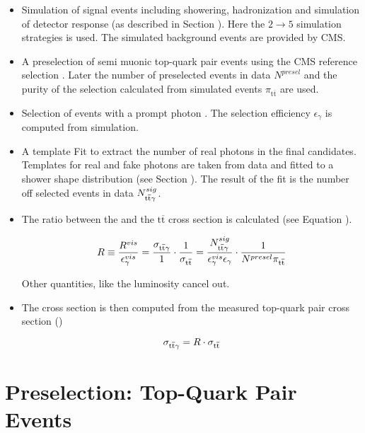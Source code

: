 \begin{itemize}
\item Simulation of \ttgamma signal events including showering, hadronization and simulation of detector response (as described in Section ). Here the $2 \to 5$ simulation strategies is used. The simulated background events are provided by CMS.
\item A preselection of semi muonic top-quark pair events using the CMS reference selection . Later the number of preselected events in data $N^{presel}$ and the purity of the selection calculated from simulated events $\pi_{\mathrm{t}\overline{\mathrm{t}}}$ are used.
\item Selection of events with a prompt photon . The selection efficiency $\epsilon_{\gamma}$ is computed from simulation.
\item A template Fit to extract the number of real photons in the final candidates. Templates for real and fake photons are taken from data and fitted to a shower shape distribution (see Section ). The result of the fit is the number off selected \ttgamma events in data $N^{sig}_{\mathrm{t}\overline{\mathrm{t}} \gamma}$.
\item The ratio between the \ttgamma and the $\mathrm{t}\overline{\mathrm{t}}$ cross section is calculated (see Equation ).

\begin{equation}
R \equiv \frac{R^{vis}}{\epsilon^{vis}_{\gamma}} = \frac{\sigma_{\mathrm{t}\overline{\mathrm{t}} \gamma}}{1} \cdot \frac{1}{\sigma_{\mathrm{t}\overline{\mathrm{t}}}} = \frac{N^{sig}_{\mathrm{t}\overline{\mathrm{t}} \gamma}}{\epsilon^{vis}_{\gamma} \epsilon_{\gamma}} \cdot \frac{1}{N^{presel} \pi_{\mathrm{t}\overline{\mathrm{t}}}}
\end{equation}

Other quantities, like the luminosity cancel out.
\item The \ttgamma cross section is then computed from the measured top-quark pair cross section ()

\begin{equation}
\sigma_{\mathrm{t}\overline{\mathrm{t}} \gamma} = R \cdot \sigma_{\mathrm{t}\overline{\mathrm{t}}}
\end{equation}

\end{itemize}

\section{Preselection: Top-Quark Pair Events}

